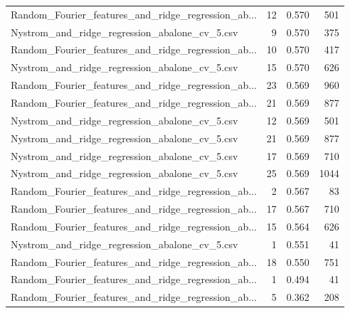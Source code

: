 \begin{tabularx}{\textwidth}{lrrr}
Random\_Fourier\_features\_and\_ridge\_regression\_ab... &       12 &               0.570 &           501 \\
     Nystrom\_and\_ridge\_regression\_abalone\_cv\_5.csv &        9 &               0.570 &           375 \\
Random\_Fourier\_features\_and\_ridge\_regression\_ab... &       10 &               0.570 &           417 \\
     Nystrom\_and\_ridge\_regression\_abalone\_cv\_5.csv &       15 &               0.570 &           626 \\
Random\_Fourier\_features\_and\_ridge\_regression\_ab... &       23 &               0.569 &           960 \\
Random\_Fourier\_features\_and\_ridge\_regression\_ab... &       21 &               0.569 &           877 \\
     Nystrom\_and\_ridge\_regression\_abalone\_cv\_5.csv &       12 &               0.569 &           501 \\
     Nystrom\_and\_ridge\_regression\_abalone\_cv\_5.csv &       21 &               0.569 &           877 \\
     Nystrom\_and\_ridge\_regression\_abalone\_cv\_5.csv &       17 &               0.569 &           710 \\
     Nystrom\_and\_ridge\_regression\_abalone\_cv\_5.csv &       25 &               0.569 &          1044 \\
Random\_Fourier\_features\_and\_ridge\_regression\_ab... &        2 &               0.567 &            83 \\
Random\_Fourier\_features\_and\_ridge\_regression\_ab... &       17 &               0.567 &           710 \\
Random\_Fourier\_features\_and\_ridge\_regression\_ab... &       15 &               0.564 &           626 \\
     Nystrom\_and\_ridge\_regression\_abalone\_cv\_5.csv &        1 &               0.551 &            41 \\
Random\_Fourier\_features\_and\_ridge\_regression\_ab... &       18 &               0.550 &           751 \\
Random\_Fourier\_features\_and\_ridge\_regression\_ab... &        1 &               0.494 &            41 \\
Random\_Fourier\_features\_and\_ridge\_regression\_ab... &        5 &               0.362 &           208 \\
\bottomrule
\end{tabularx}
